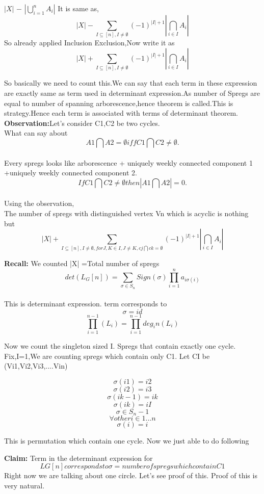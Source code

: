 $|X|$ $-$ $|\bigcup_{i=1}^{n} A_i|$
It is same as,
$$|X| - \sum_{I \subseteq [n] , I \neq \emptyset} (-1)^{|I|+1}|\bigcap_{i \in I} A_i|$$
So already applied Inclusion Exclusion,Now write it as
$$ |X| + \sum_{I \subseteq [n] , I \neq \emptyset} (-1)^{|I|+1}|\bigcap_{i \in I} A_i| $$

So basically we need to count this.We can say that each term in these expression are exactly same as term used in determinant expression.As number of Spregs are equal to number of spanning arborescence,hence theorem is called.This is strategy.Hence each term is associated with terms of determinant theorem.\\
\textbf{Observation:}Let's consider C1,C2 be two cycles.\\
What can say about $$ A1 \bigcap A2 = \emptyset iff C1
  \bigcap C2 \neq \emptyset.$$\\
Every spregs looks like arborescence + uniquely weekly connected component 1 +uniquely weekly connected component 2.\\
$$ If C1 \bigcap C2 \neq \emptyset then |A1 \bigcap A2| =0.$$\\
Using the observation,\\
The number of spregs with distinguished vertex Vn which is acyclic is nothing but \\
$$ |X| + \sum_{I \subseteq [n] ,I \neq \emptyset ,for J,K \in I, J \neq K, cj \bigcap ck =\emptyset}       (-1)^{|I|+1}|\bigcap_{i \in I} A_i| $$

\textbf{Recall:} We counted |X| =Total number of spregs\\
$$det(L_G[n]) = \sum_{\sigma \in S_n} Sign(\sigma)  \prod_{i=1}^{n} a_{i\sigma(i)}$$\\
This is determinant expression. term   corresponds   to   $$ \sigma=id $$
$$\prod_{i=1}^{n-1} (L_i) = \prod_{i=1}^{n-1} deg_in(L_i) $$

Now we count the singleton sized I.
Spregs that contain exactly one cycle.
Fix,I={1},We are counting spregs which contain only C1.
Let  CI be (Vi1,Vi2,Vi3,....Vin)

$$\sigma(i1)=i2$$
$$\sigma(i2)=i3$$
$$\sigma(ik-1)=ik$$
$$\sigma(ik)=iI$$
$$\sigma \in S_n-1$$
$$\forall other  i \in {1...n} $$
$$ \sigma(i)=i $$

This is permutation which contain one cycle.
Now we just able to do following

\textbf{Claim:} Term in the determinant expression for
$$LG[n] corresponds to \sigma=number of spregs which contain C1$$
Right now we are talking about one circle.
Let's see proof of this.
Proof of this is very natural.

